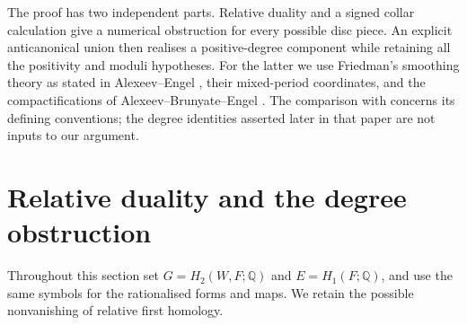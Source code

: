 \documentclass[11pt]{article}
\theoremstyle{definition}
\theoremstyle{remark}
\newcommand{\Q}{\mathbb Q}
\begin{document}

The proof has two independent parts. Relative duality and a signed collar calculation give a numerical obstruction for every possible disc piece. An explicit anticanonical union then realises a positive-degree component while retaining all the positivity and moduli hypotheses. For the latter we use Friedman's smoothing theory as stated in Alexeev--Engel \cite[Theorem~3.5 and \S7A]{AE}, their mixed-period coordinates, and the compactifications of Alexeev--Brunyate--Engel \cite{ABE}. The comparison with \cite{GT} concerns its defining conventions; the degree identities asserted later in that paper are not inputs to our argument.

\section{Relative duality and the degree obstruction}

Throughout this section set $G=H_2(W,F;\Q)$ and $E=H_1(F;\Q)$, and use the same symbols for the rationalised forms and maps. We retain the possible nonvanishing of relative first homology.
\end{document}
